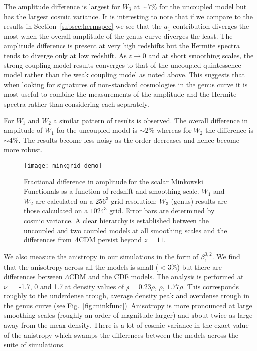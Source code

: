 \documentclass[a4paper,fleqn,usenatbib]{mnras}
\begin{document}
The amplitude difference is largest for $W_3$ at $\sim 7\%$ for the uncoupled model but has the largest cosmic variance. It is interesting to note that if we compare to the results in Section~\ref{subsec:hermspec} we see that the $a_1$ contribution diverges the most when the overall amplitude of the genus curve diverges the least. The amplitude difference is present at very high redshifts but the Hermite spectra tends to diverge only at low redshift. As $z \to 0$ and at short smoothing scales, the strong coupling model results converges to that of the uncoupled quintessence model rather than the weak coupling model as noted above. This suggests that when looking for signatures of non-standard cosmologies in the genus curve it is most useful to combine the measurements of the amplitude and the Hermite spectra rather than considering each separately.

For $W_1$ and $W_2$ a similar pattern of results is observed. The overall difference in amplitude of $W_1$ for the uncoupled model is $\sim 2\%$ whereas for $W_2$ the difference is $\sim 4\%$. The results become less noisy as the order decreases and hence become more robust.

\begin{figure*}
	\texttt{[image: minkgrid\_demo]}
   \caption{Fractional difference in amplitude for the scalar Minkowski Functionals as a function of redshift and smoothing scale. $W_1$ and $W_2$ are calculated on a $256^3$ grid resolution; $W_3$ (genus) results are those calculated on a $1024^3$ grid. Error bars are determined by cosmic variance. A clear hierarchy is established between the uncoupled and two coupled models at all smoothing scales and the differences from $\Lambda$CDM persist beyond $z=11$.}
   \label{fig:mink}
\end{figure*}

We also measure the anistropy in our simulations in the form of $\beta_1^{0,2}$. We find that the anisotropy across all the models is small ($< 3\%$) but there are differences between $\Lambda$CDM and the CDE models. The analysis is performed at $\nu =$ -1.7, 0 and 1.7 at density values of $\rho = 0.23 \bar{\rho}$, $\bar{\rho}$, $1.77 \bar{\rho}$. This corresponds roughly to the underdense trough, average density peak and overdense trough in the genus curve (see Fig.~\ref{fig:minkfunc}). Anisotropy is more pronounced at large smoothing scales (roughly an order of magnitude larger) and about twice as large away from the mean density. There is a lot of cosmic variance in the exact value of the anistropy which swamps the differences between the models across the suite of simulations. 
\end{document}
